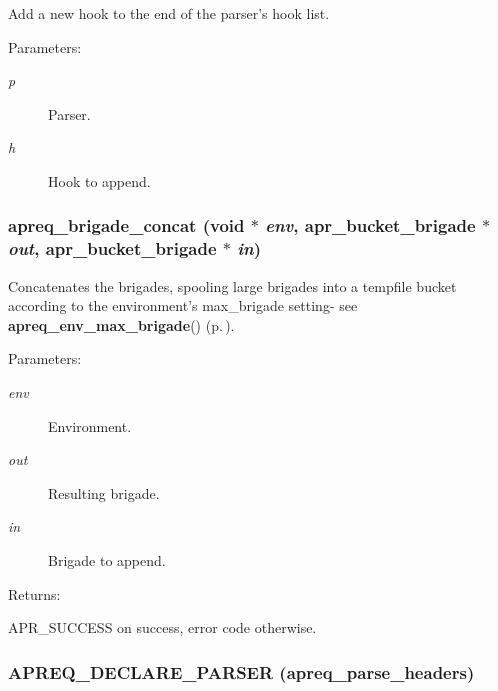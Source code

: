 Add a new hook to the end of the parser's hook list.\begin{Desc}
\item[Parameters: ]\par
\begin{description}
\item[{\em 
p}]Parser. \item[{\em 
h}]Hook to append. \end{description}
\end{Desc}
\subsubsection{ apreq\_\-brigade\_\-concat ({\bf void} $\ast$ {\em env}, {\bf apr\_\-bucket\_\-brigade} $\ast$ {\em out}, {\bf apr\_\-bucket\_\-brigade} $\ast$ {\em in})}\label{group__params_a16}


Concatenates the brigades, spooling large brigades into a tempfile bucket according to the environment's max\_\-brigade setting- see {\bf apreq\_\-env\_\-max\_\-brigade}() {\rm (p.\,\pageref{group__ENV_a11})}. \begin{Desc}
\item[Parameters: ]\par
\begin{description}
\item[{\em 
env}]Environment. \item[{\em 
out}]Resulting brigade. \item[{\em 
in}]Brigade to append. \end{description}
\end{Desc}
\begin{Desc}
\item[Returns: ]\par
APR\_\-SUCCESS on success, error code otherwise. \end{Desc}
\subsubsection{\setlength{\rightskip}{0pt plus 5cm}APREQ\_\-DECLARE\_\-PARSER (apreq\_\-parse\_\-headers)}\label{group__params_a17}


